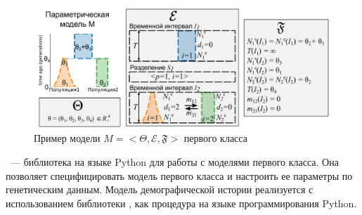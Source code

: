 \documentclass[a4paper,14pt,oneside,openany,article]{memoir}
\begin{document}
\begin{figure}[h]
    \centering
    \includegraphics[width=\textwidth]{images_2/model_1_type.pdf}
    \caption{Пример модели $M = <\Theta, \mathcal{E}, \mathfrak{F}>$ первого класса}
    \label{fig:model_1_type}
\end{figure}



\dadi~--- библиотека на языке Python для работы с моделями первого класса.
Она позволяет специфицировать модель первого класса и настроить ее параметры по генетическим данным.
Модель демографической истории реализуется с использованием библиотеки \dadi, как процедура на языке программирования Python.
\end{document}
